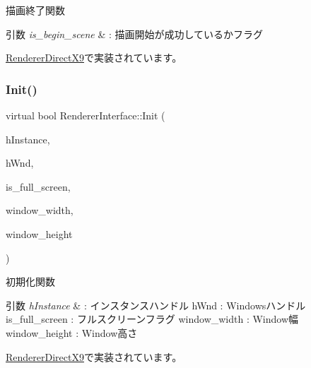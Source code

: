 描画終了関数 


\begin{DoxyParams}{引数}
{\em is\+\_\+begin\+\_\+scene} & \+: 描画開始が成功しているかフラグ \\
\hline
\end{DoxyParams}


\mbox{\hyperlink{class_renderer_direct_x9_a8a29b6e70fa8b2f55a12c11143184ce1}{Renderer\+Direct\+X9}}で実装されています。

\mbox{\label{class_renderer_interface_aabef76c27c2332c1af2dbcf7e8de5d38}} 
\subsubsection{\texorpdfstring{Init()}{Init()}}
{\footnotesize\ttfamily virtual bool Renderer\+Interface\+::\+Init (\begin{DoxyParamCaption}\item[{H\+I\+N\+S\+T\+A\+N\+CE}]{h\+Instance,  }\item[{H\+W\+ND}]{h\+Wnd,  }\item[{B\+O\+OL}]{is\+\_\+full\+\_\+screen,  }\item[{int}]{window\+\_\+width,  }\item[{int}]{window\+\_\+height }\end{DoxyParamCaption})\hspace{0.3cm}{\ttfamily [pure virtual]}}



初期化関数 


\begin{DoxyParams}{引数}
{\em h\+Instance} & \+: インスタンスハンドル h\+Wnd \+: Windowsハンドル is\+\_\+full\+\_\+screen \+: フルスクリーンフラグ window\+\_\+width \+: Window幅 window\+\_\+height \+: Window高さ \\
\hline
\end{DoxyParams}


\mbox{\hyperlink{class_renderer_direct_x9_a28da461025c48770a360b8d399a8414f}{Renderer\+Direct\+X9}}で実装されています。

\mbox{\label{class_renderer_interface_ada105489f9db98e7e9542b278699d558}} 
